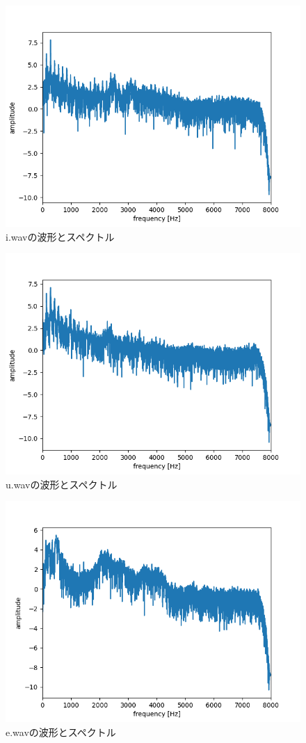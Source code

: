 \documentclass[11pt,a4j]{jarticle}%
\begin{document}
\begin{figure}[H]
  \centering
  \includegraphics[width=120mm]{img/i-plot-spectrum-whole.png}
  \caption{i.wavの波形とスペクトル}
\end{figure}

\begin{figure}[H]
  \centering
  \includegraphics[width=120mm]{img/u-plot-spectrum-whole.png}
  \caption{u.wavの波形とスペクトル}
\end{figure}
\begin{figure}[H]
  \centering
  \includegraphics[width=120mm]{img/e-plot-spectrum-whole.png}
  \caption{e.wavの波形とスペクトル}
\end{figure}
\end{document}
